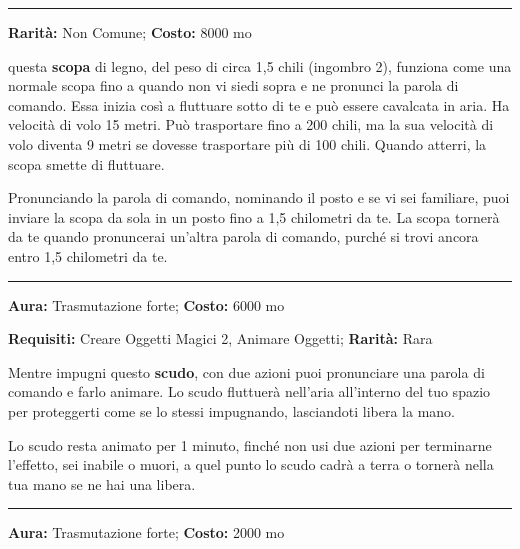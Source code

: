 \begin{multicols}{2}
\smallskip\noindent\rule{\linewidth}{2pt}  \hypertarget{ScopaVolante}{}\medskip{}\noindent\label{ScopaVolante}

\textbf{Rarità:} Non Comune; \textbf{Costo:} 8000 mo

questa \textbf{scopa} di legno, del peso di circa 1,5 chili (ingombro 2), funziona come una normale scopa fino a quando non vi siedi sopra e ne pronunci la parola di comando. Essa inizia così a fluttuare sotto di te e può essere cavalcata in aria. Ha velocità di volo 15 metri. Può trasportare fino a 200 chili, ma la sua velocità di volo diventa 9 metri se dovesse trasportare più di 100 chili. Quando atterri, la scopa smette di fluttuare.

Pronunciando la parola di comando, nominando il posto e se vi sei familiare, puoi inviare la scopa da sola in un posto fino a 1,5 chilometri da te. La scopa tornerà da te quando pronuncerai un'altra parola di comando, purché si trovi ancora entro 1,5 chilometri da te.

\smallskip\noindent\rule{\linewidth}{2pt}  \hypertarget{ScudoAnimato}{}\medskip{}\noindent\label{ScudoAnimato}

\textbf{Aura:} Trasmutazione forte; \textbf{Costo:} 6000 mo

\textbf{Requisiti:} Creare Oggetti Magici 2, Animare Oggetti; \textbf{Rarità:} Rara

Mentre impugni questo \textbf{scudo}, con due azioni puoi pronunciare una parola di comando e farlo animare. Lo scudo fluttuerà nell'aria all'interno del tuo spazio per proteggerti come se lo stessi impugnando, lasciandoti libera la mano.

Lo scudo resta animato per 1 minuto, finché non usi due azioni per terminarne l'effetto, sei inabile o muori, a quel punto lo scudo cadrà a terra o tornerà nella tua mano se ne hai una libera.

\smallskip\noindent\rule{\linewidth}{2pt}  \hypertarget{Scudodell'AttrazionedeiProiettili}{}\medskip{}\noindent\label{Scudodell'AttrazionedeiProiettili}

\textbf{Aura:} Trasmutazione forte; \textbf{Costo:} 2000 mo


\end{multicols}

